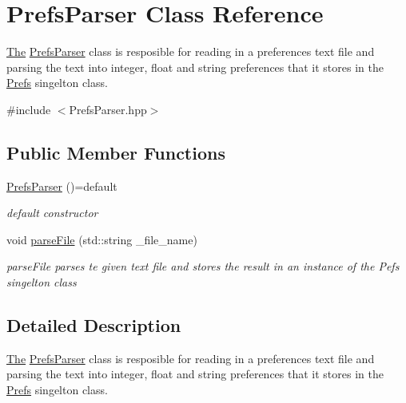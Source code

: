 \hypertarget{class_prefs_parser}{}\section{Prefs\+Parser Class Reference}
\label{class_prefs_parser}


\hyperlink{namespace_the}{The} \hyperlink{class_prefs_parser}{Prefs\+Parser} class is resposible for reading in a preferences text file and parsing the text into integer, float and string preferences that it stores in the \hyperlink{class_prefs}{Prefs} singelton class.  




{\ttfamily \#include $<$Prefs\+Parser.\+hpp$>$}

\subsection*{Public Member Functions}
\begin{DoxyCompactItemize}
\item 
\hypertarget{class_prefs_parser_a185832a1c19c5f5c95baf1ce5621f91a}{}\hyperlink{class_prefs_parser_a185832a1c19c5f5c95baf1ce5621f91a}{Prefs\+Parser} ()=default\label{class_prefs_parser_a185832a1c19c5f5c95baf1ce5621f91a}

\begin{DoxyCompactList}\small\item\em default constructor \end{DoxyCompactList}\item 
void \hyperlink{class_prefs_parser_a166117037558f1164bf68c7e1eeb4ddb}{parse\+File} (std\+::string \+\_\+file\+\_\+name)
\begin{DoxyCompactList}\small\item\em parse\+File parses te given text file and stores the result in an instance of the Pefs singelton class \end{DoxyCompactList}\end{DoxyCompactItemize}


\subsection{Detailed Description}
\hyperlink{namespace_the}{The} \hyperlink{class_prefs_parser}{Prefs\+Parser} class is resposible for reading in a preferences text file and parsing the text into integer, float and string preferences that it stores in the \hyperlink{class_prefs}{Prefs} singelton class. 


